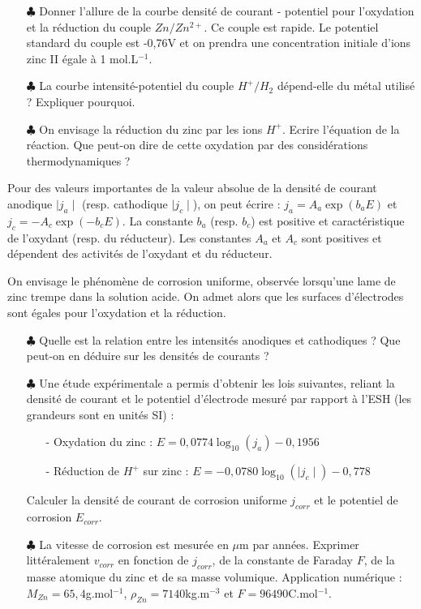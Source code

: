 \documentclass{report}
\begin{document}
\begin{itemize}

	\item[$\clubsuit$] Donner l'allure de la courbe densité de courant - potentiel pour l'oxydation et la réduction du couple $Zn/Zn^{2+}$. Ce couple est rapide. Le potentiel standard du couple est -0,76V et on prendra une concentration initiale d'ions zinc II égale à 1 mol.L$^{-1}$.
	
	\item[$\clubsuit$] La courbe intensité-potentiel du couple $H^+/H_2$ dépend-elle du métal utilisé ? Expliquer pourquoi.
	
	\item[$\clubsuit$] On envisage la réduction du zinc par les ions $H^+$. Ecrire l'équation de la réaction. Que peut-on dire de cette oxydation par des considérations thermodynamiques ?

\end{itemize}

Pour des valeurs importantes de la valeur absolue de la densité de courant anodique $\mid j_a\mid$ (resp. cathodique $\mid j_c\mid$), on peut écrire : $j_a=A_a\exp(b_aE)$ et $j_c=-A_c\exp(-b_cE)$. La constante $b_a$ (resp. $b_c$) est positive et caractéristique de l'oxydant (resp. du réducteur). Les constantes $A_a$ et $A_c$ sont positives et dépendent des activités de l'oxydant et du réducteur.

On envisage le phénomène de corrosion uniforme, observée lorsqu'une lame de zinc trempe dans la solution acide. On admet alors que les surfaces d'électrodes sont égales pour l'oxydation et la réduction. 

\begin{itemize}

	\item[$\clubsuit$] Quelle est la relation entre les intensités anodiques et cathodiques ? Que peut-on en déduire sur les densités de courants ?
	
	\item[$\clubsuit$] Une étude expérimentale a permis d'obtenir les lois suivantes, reliant la densité de courant et le potentiel d'électrode mesuré par rapport à l'ESH (les grandeurs sont en unités SI) :
	\begin{itemize}
		\item[-] Oxydation du zinc : $E=0,0774\log_{10}(j_a)-0,1956$
		\item[-] Réduction de $H^+$ sur zinc : $E=-0,0780\log_{10}(\mid j_c\mid)-0,778$
	\end{itemize}
Calculer la densité de courant de corrosion uniforme $j_{corr}$ et le potentiel de corrosion $E_{corr}$.

	\item[$\clubsuit$] La vitesse de corrosion est mesurée en $\mu$m par années. Exprimer littéralement $v_{corr}$ en fonction de $j_{corr}$, de la constante de Faraday $F$, de la masse atomique du zinc et de sa masse volumique. Application numérique : $M_{Zn}=65,4$g.mol$^{-1}$, $\rho_{Zn}=7140$kg.m$^{-3}$ et $F=96490$C.mol$^{-1}$.
\end{itemize}
\end{document}
